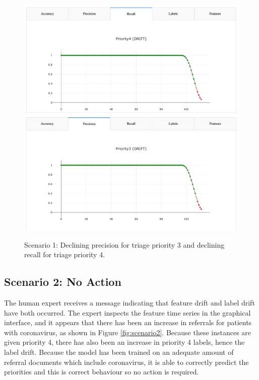 \begin{figure}
    \centering
    \includegraphics[width=\textwidth]{images/recall_p4.png}
    \includegraphics[width=\textwidth]{images/precision_p3.png}
    \caption{Scenario 1: Declining precision for triage priority 3 and declining recall for triage priority 4.}
    \label{fig:scenario1}
\end{figure}
 

\subsection{Scenario 2: No Action}

The human expert receives a message indicating that feature drift and label drift have both occurred. The expert inspects the feature time series in the graphical interface, and it appears that there has been an increase in referrals for patients with coronavirus, as shown in Figure \ref{fig:scenario2}. Because these instances are given priority 4, there has also been an increase in priority 4 labels, hence the label drift. Because the model has been trained on an adequate amount of referral documents which include coronavirus, it is able to correctly predict the priorities and this is correct behaviour so no action is required.

